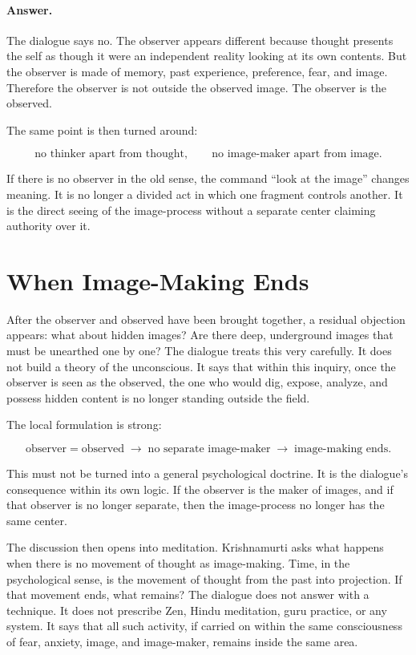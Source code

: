 \paragraph{Answer.}
The dialogue says no. The observer appears different because thought presents the self as though it were an independent reality looking at its own contents. But the observer is made of memory, past experience, preference, fear, and image. Therefore the observer is not outside the observed image. The observer is the observed.

The same point is then turned around:

\begin{equation}
\text{no thinker apart from thought},
\qquad
\text{no image-maker apart from image}.
\end{equation}

If there is no observer in the old sense, the command ``look at the image'' changes meaning. It is no longer a divided act in which one fragment controls another. It is the direct seeing of the image-process without a separate center claiming authority over it.

\section{When Image-Making Ends}

After the observer and observed have been brought together, a residual objection appears: what about hidden images? Are there deep, underground images that must be unearthed one by one? The dialogue treats this very carefully. It does not build a theory of the unconscious. It says that within this inquiry, once the observer is seen as the observed, the one who would dig, expose, analyze, and possess hidden content is no longer standing outside the field.

The local formulation is strong:

\begin{equation}
\text{observer} = \text{observed}
\;\longrightarrow\;
\text{no separate image-maker}
\;\longrightarrow\;
\text{image-making ends}.
\end{equation}

This must not be turned into a general psychological doctrine. It is the dialogue's consequence within its own logic. If the observer is the maker of images, and if that observer is no longer separate, then the image-process no longer has the same center.

The discussion then opens into meditation. Krishnamurti asks what happens when there is no movement of thought as image-making. Time, in the psychological sense, is the movement of thought from the past into projection. If that movement ends, what remains? The dialogue does not answer with a technique. It does not prescribe Zen, Hindu meditation, guru practice, or any system. It says that all such activity, if carried on within the same consciousness of fear, anxiety, image, and image-maker, remains inside the same area.

